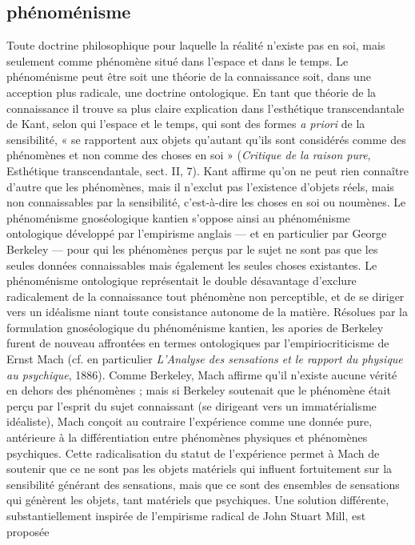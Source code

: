 \subsection{phénoménisme}
Toute doctrine philosophique
pour laquelle la réalité n’existe
pas en soi, mais seulement comme phénomène
situé dans l’espace et dans le temps.
Le phénoménisme peut être soit une
théorie de la connaissance soit, dans une
acception plus radicale, une doctrine
ontologique. En tant que théorie de la
connaissance il trouve sa plus claire explication
dans l’esthétique transcendantale
de Kant, selon qui l’espace et le temps,
qui sont des formes {\it a priori} de la sensibilité,
« se rapportent aux objets qu'autant
qu'ils sont considérés comme des phénomènes
et non comme des choses en soi »
({\it Critique de la raison pure}, Esthétique
transcendantale, sect. II, 7). Kant affirme
qu’on ne peut rien connaître d’autre que
les phénomènes, mais il n’exclut pas
l'existence d’objets réels, mais non
connaissables par la sensibilité, c’est-à-dire
les choses en soi ou noumènes. Le
phénoménisme  gnoséologique  kantien
s'oppose ainsi au phénoménisme ontologique
développé par l’empirisme anglais
— et en particulier par George Berkeley —
pour qui les phénomènes perçus par le
sujet ne sont pas que les seules données
connaissables mais également les seules
choses existantes. Le  phénoménisme
ontologique représentait le double désavantage
d’exclure radicalement de la
connaissance tout phénomène non perceptible,
et de se diriger vers un idéalisme
niant toute consistance autonome de la
matière. Résolues par la formulation gnoséologique
du phénoménisme kantien, les
apories de Berkeley furent de nouveau
affrontées en termes ontologiques par
l’empiriocriticisme de Ernst Mach (cf. en
particulier {\it L'Analyse des sensations et le
rapport du physique au psychique}, 1886).
Comme Berkeley, Mach affirme qu'il
n'existe aucune vérité en dehors des phénomènes ;
mais si Berkeley soutenait que
le phénomène était perçu par l'esprit du
sujet connaissant (se dirigeant vers un
immatérialisme idéaliste), Mach conçoit
au contraire l’expérience comme une donnée
pure, antérieure à la différentiation
entre phénomènes physiques et phénomènes
psychiques. Cette radicalisation du
statut de l'expérience permet à Mach de
soutenir que ce ne sont pas les objets
matériels qui influent fortuitement sur la
sensibilité générant des sensations, mais
que ce sont des ensembles de sensations
qui génèrent les objets, tant matériels que
psychiques. Une solution différente, substantiellement
inspirée de l’empirisme
radical de John Stuart Mill, est proposée
